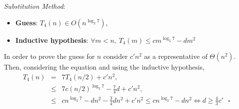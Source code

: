 \documentclass{article}
\begin{document}
	
	\noindent \textit{Substitution Method}:
	\begin{itemize}
		\item \textbf{Guess}: $T_4(n) \in O(n^{\log_2 7})$,  
		\item \textbf{Inductive hypothesis}: $\forall m < n, ~  T_4(m) \leq cm^{\log_2 7} - dm^2$ 
	\end{itemize} 
	In order to prove the guess for $n$ consider $c'n^2$ as a representative of $\Theta(n^2)$. Then, considering the equation and using the inductive hypothesis,
	\begin{eqnarray}
	\nonumber
	T_4(n) &=& 7 T_4 (n/2) + c'n^2,\\
	\nonumber
	&\leq& 7 c (n/2)^{\log_2 7} - \frac{7}{4}d + c'n^2,\\
	\nonumber
	&\leq& cn^{\log_2 7} - dn^2 -\frac{3}{4} dn^2 + c'n^2 \leq  cn^{\log_2 7} -dn^2  \Leftrightarrow d \geq \frac{4}{3} c' ~~~ \square
	\nonumber 
	\end{eqnarray} 
\end{document}
